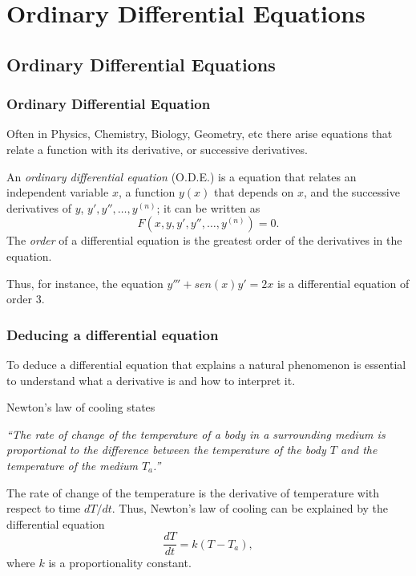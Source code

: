 \section{Ordinary Differential Equations}



\subsection{Ordinary Differential Equations}
\begin{frame}
\frametitle{Ordinary Differential Equation}
Often in Physics, Chemistry, Biology, Geometry, etc there arise equations that relate a function with its derivative, or successive derivatives.

\begin{definition}
An \emph{ordinary differential equation} (O.D.E.) is a equation that relates an independent variable $x$, a function $y(x)$ that depends on $x$, and the successive derivatives of $y$, $y',y'',\ldots,y^{(n)}$; it can be written as
\[
F(x, y, y', y'',\ldots, y^{(n)})=0.
\] 
The \emph{order} of a differential equation is the greatest order of the derivatives in the equation. 
\end{definition}
Thus, for instance, the equation $y'''+sen(x)y'=2x$ is a differential equation of order 3.
\end{frame}


\begin{frame}
\frametitle{Deducing a differential equation}
To deduce a differential equation that explains a natural phenomenon is essential to understand what a derivative is and how to interpret it. 

 Newton's law of cooling states
\begin{center}
\begin{minipage}{0.8\textwidth}
\textit{``The rate of change of the temperature of a body in a surrounding medium is proportional to the difference between the temperature of the body $T$ and the temperature of the medium $T_a$.''}
\end{minipage}
\end{center}
The rate of change of the temperature is the derivative of temperature with respect to time $dT/dt$.
Thus, Newton's law of cooling can be explained by the differential equation
\[
\frac{dT}{dt}=k(T-T_a),
\]
where $k$ is a proportionality constant.
\end{frame}



